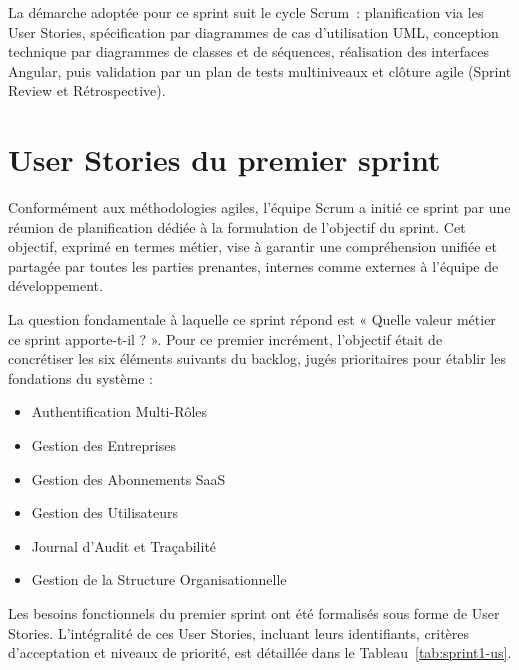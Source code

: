   La démarche adoptée pour ce sprint suit le cycle Scrum~: planification via les User Stories,
  spécification par diagrammes de cas d'utilisation UML, conception technique par diagrammes
  de classes et de séquences, réalisation des interfaces Angular, puis validation par un plan
  de tests multiniveaux et clôture agile (Sprint Review et Rétrospective).
\section{User Stories du premier sprint}
\label{sec:s1-userstories}

Conformément aux méthodologies agiles, l'équipe Scrum a initié ce sprint par une réunion de planification dédiée à la formulation de l'objectif du sprint. Cet objectif, exprimé en termes métier, vise à garantir une compréhension unifiée et partagée par toutes les parties prenantes, internes comme externes à l'équipe de développement.

La question fondamentale à laquelle ce sprint répond est « Quelle valeur métier ce sprint apporte-t-il ? ». Pour ce premier incrément, l'objectif était de concrétiser les six éléments suivants du backlog, jugés prioritaires pour établir les fondations du système :

\begin{itemize}[label=\textbullet, leftmargin=0.6cm]
    \item Authentification Multi-Rôles
    \item Gestion des Entreprises
    \item Gestion des Abonnements SaaS
    \item Gestion des Utilisateurs
    \item Journal d'Audit et Traçabilité
    \item Gestion de la Structure Organisationnelle
\end{itemize}
Les besoins fonctionnels du premier sprint ont été formalisés sous forme de User Stories. 
L'intégralité de ces User Stories, incluant leurs identifiants, critères d'acceptation et 
niveaux de priorité, est détaillée dans le Tableau~\ref{tab:sprint1-us}.

